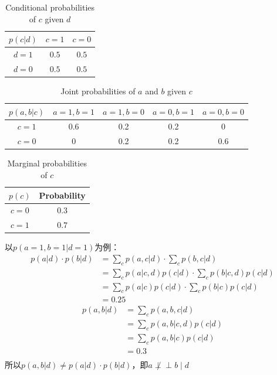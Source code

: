 \documentclass[8pt]{article}
\begin{document}
\begin{enumerate}[(i)]
        \begin{table}[H]
            \centering
            \begin{tabular}{|c|c|c|}
                \hline
                $p(c|d)$ & $c=1$ & $c=0$ \\
                \hline
                $d=1$ & $0.5$ & $0.5$ \\
                \hline
                $d=0$ & $0.5$ & $0.5$ \\
                \hline
            \end{tabular}
            \caption{Conditional probabilities of $c$ given $d$}
        \end{table}
        
        \begin{table}[H]
            \centering
            \begin{tabular}{|c|c|c|c|c|}
                \hline
                $p(a,b|c)$ & $a=1, b=1$ & $a=1, b=0$ & $a=0, b=1$ & $a=0, b=0$ \\
                \hline
                $c=1$ & 0.6 & 0.2 & 0.2 & 0 \\
                \hline
                $c=0$ & 0 & 0.2 & 0.2 & 0.6 \\
                \hline
            \end{tabular}
            \caption{Joint probabilities of $a$ and $b$ given $c$}
        \end{table}
        
        \begin{table}[H]
            \centering
            \begin{tabular}{|c|c|}
                \hline
                $p(c)$ & Probability \\
                \hline
                $c=0$ & $0.3$ \\
                \hline
                $c=1$ & $0.7$ \\
                \hline
            \end{tabular}
            \caption{Marginal probabilities of $c$}
        \end{table}
       以$p(a=1,b=1|d=1)$为例：
        \begin{align*}
        p(a|d) \cdot p(b|d) 
        &= 
        \sum_{c}p(a,c|d) \cdot \sum_{c}p(b,c|d) \\
        &=\sum_{c}p(a|c,d)p(c|d) \cdot \sum_{c}p(b|c,d)p(c|d) \\
        &=\sum_{c}p(a|c)p(c|d) \cdot \sum_{c}p(b|c)p(c|d) \\
        &=0.25
        \end{align*}
        \begin{align*}
        p(a,b|d) 
        &= \sum_{c}p(a,b,c|d) \\
        &= \sum_{c}p(a,b|c,d)p(c|d) \\
        &= \sum_{c}p(a,b|c)p(c|d) \\
        &= 0.3\\
        \end{align*}
        所以$p(a,b|d)\not=p(a|d) \cdot p(b|d)$，即\(a \not\perp\!\!\!\perp b \mid d\)
        \vspace{1em}


\end{enumerate}
\end{document}
